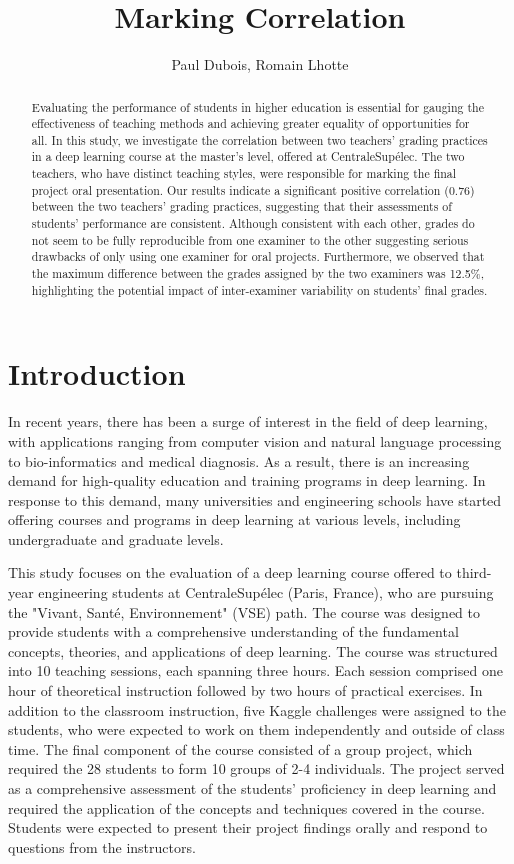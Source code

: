 \documentclass[a4paper]{article}
\title{Marking Correlation}
\author{Paul Dubois, Romain Lhotte}
\begin{document}
	\maketitle
	\begin{abstract}
		Evaluating the performance of students in higher education is essential for gauging the effectiveness of teaching methods and achieving greater equality of opportunities for all.
		In this study, we investigate the correlation between two teachers' grading practices in a deep learning course at the master's level, offered at CentraleSupélec.
		The two teachers, who have distinct teaching styles, were responsible for marking the final project oral presentation.
		Our results indicate a significant positive correlation (0.76) between the two teachers' grading practices, suggesting that their assessments of students' performance are consistent.
		Although consistent with each other, grades do not seem to be fully reproducible from one examiner to the other suggesting serious drawbacks of only using one examiner for oral projects.
		Furthermore, we observed that the maximum difference between the grades assigned by the two examiners was 12.5\%, highlighting the potential impact of inter-examiner variability on students' final grades.
	\end{abstract}
	
	\section{Introduction}
	In recent years, there has been a surge of interest in the field of deep learning, with applications ranging from computer vision and natural language processing to bio-informatics and medical diagnosis.
	As a result, there is an increasing demand for high-quality education and training programs in deep learning.
	In response to this demand, many universities and engineering schools have started offering courses and programs in deep learning at various levels, including undergraduate and graduate levels.
	
	This study focuses on the evaluation of a deep learning course offered to third-year engineering students at CentraleSupélec (Paris, France), who are pursuing the "Vivant, Santé, Environnement" (VSE) path.
	The course was designed to provide students with a comprehensive understanding of the fundamental concepts, theories, and applications of deep learning.
	The course was structured into 10 teaching sessions, each spanning three hours.
	Each session comprised one hour of theoretical instruction followed by two hours of practical exercises.
	In addition to the classroom instruction, five Kaggle challenges were assigned to the students, who were expected to work on them independently and outside of class time.
	The final component of the course consisted of a group project, which required the 28 students to form 10 groups of 2-4 individuals.
	The project served as a comprehensive assessment of the students' proficiency in deep learning and required the application of the concepts and techniques covered in the course.
	Students were expected to present their project findings orally and respond to questions from the instructors.
	
\end{document}
